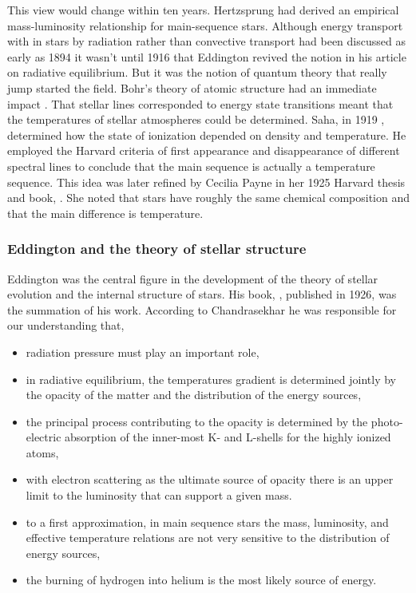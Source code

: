 This  view would change within ten
years. Hertzsprung \cite{Hertzsprung1919} had derived an empirical
mass-luminosity relationship for main-sequence stars. Although energy
transport with in stars by radiation rather than convective transport
had been discussed as early as 1894 it wasn't until 1916 that
Eddington \cite{Eddington1916} revived the notion in his article on
radiative equilibrium. But it was the notion of quantum theory that
really jump started the field. Bohr's theory of atomic structure had
an immediate impact \cite{Bohr1913}. That stellar lines corresponded
to energy state transitions meant that the temperatures of stellar
atmospheres could be determined. Saha, in 1919 \cite{Saha1919},
determined how the state of ionization depended on density and
temperature. He employed the Harvard criteria of first appearance and
disappearance of different spectral lines to conclude that the main
sequence is actually a temperature sequence. This idea was later
refined by Cecilia Payne  in her 1925 Harvard
thesis and book,  \cite{Payne1925}. She noted
that stars have roughly the same chemical composition and that the
main difference is temperature.

\subsubsection{Eddington and the theory of stellar structure}

Eddington was the central figure in the development of the theory of
stellar evolution and the internal structure of stars. His
book, , published in
1926, was the summation of his work. According to Chandrasekhar
he was responsible for our understanding that,
\begin{itemize}
\item radiation pressure must play an important role,
\item in radiative equilibrium, the temperatures gradient is
      determined jointly by the opacity of the matter and the
      distribution of the energy sources,
\item the principal process contributing to the opacity is
      determined by the photo-electric absorption of the inner-most K-
      and L-shells for the highly ionized atoms,
\item with electron scattering as the ultimate source of opacity
      there is an upper limit to the luminosity that can support a
      given mass.
\item to a first approximation, in main sequence stars the mass, luminosity,
      and effective temperature relations are not very sensitive to
      the distribution of energy sources,
\item the burning of hydrogen into helium is the most likely source of
      energy.
\end{itemize}
      
